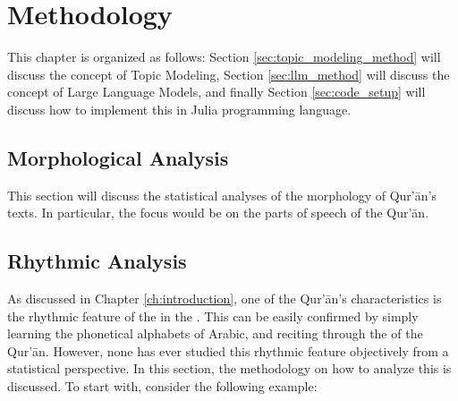 
\chapter{Methodology}
This chapter is organized as follows: Section \ref{sec:topic_modeling_method} will discuss the concept of Topic Modeling, Section \ref{sec:llm_method} will discuss the concept of Large Language Models, and finally Section \ref{sec:code_setup} will discuss how to implement this in Julia programming language.
\section{Morphological Analysis}
This section will discuss the statistical analyses of the morphology of Qur'\=an's texts. In particular, the focus would be on the parts of speech of the Qur'\=an.
\section{Rhythmic Analysis}
As discussed in Chapter \ref{ch:introduction}, one of the Qur'\=an's characteristics is the rhythmic feature of the   in the . This can be easily confirmed by simply learning the phonetical alphabets of Arabic, and reciting through the   of the Qur'\=an. However, none has ever studied this rhythmic feature objectively from a statistical perspective. In this section, the methodology on how to analyze this is discussed. To start with, consider the following example:
